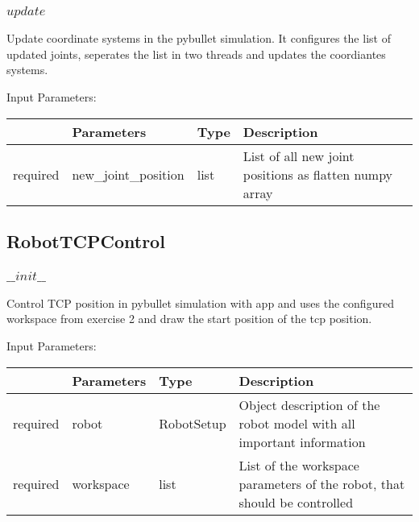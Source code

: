 \documentclass[
	ngerman,
	accentcolor=9c,%
	type=intern,
	marginpar=false
	]{tudapub}
\begin{document}
\subsubsection{$update$}
\noindent Update coordinate systems in the pybullet simulation. It configures the list of updated joints, seperates the list in two threads and updates the coordiantes systems.

\vspace{0.5cm}
\noindent Input Parameters:
\vspace{0.5cm}

\begin{tabular}{|p{}|p{}|p{}| p{}|}
\hline
 & \textbf{Parameters} & \textbf{Type} & \textbf{Description} \\
\hline
required & new\_joint\_position & list & List of all new joint positions  as flatten numpy array\\
\hline
\end{tabular}
\vspace{1cm}



\subsection{RobotTCPControl}

\subsubsection{$\_\_init\_\_$}
\noindent Control TCP position in pybullet simulation with app and uses the configured workspace from exercise 2 and draw the start position of the tcp position. 

\vspace{0.5cm}
\noindent Input Parameters:
\vspace{0.5cm}

\begin{tabular}{|p{}|p{}|p{}| p{}|}
\hline
 & \textbf{Parameters} & \textbf{Type} & \textbf{Description} \\
\hline
required & robot & RobotSetup & Object description of the robot model with all important information \\
\hline
required & workspace & list &  List of the workspace parameters of the robot, that should be controlled\\
\hline
\end{tabular}
\vspace{1cm}
\end{document}

